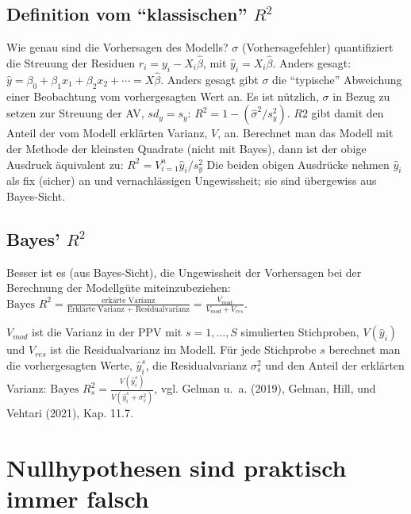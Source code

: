 \documentclass[
  a4paper,
  DIV=11]{scrreprt}
\theoremstyle{definition}
\theoremstyle{remark}
\begin{document}
\hypertarget{definition-vom-klassischen-r2}{%
\subsection{\texorpdfstring{Definition vom ``klassischen''
\(R^2\)}{Definition vom ``klassischen'' R\^{}2}}\label{definition-vom-klassischen-r2}}

Wie genau sind die Vorhersagen des Modells? \(\sigma\)
(Vorhersagefehler) quantifiziert die Streuung der Residuen
\(r_i = y_i - X_i\hat{\beta}\), mit \(\hat{y}_i = X_i\hat{\beta}\).
Anders gesagt:
\(\hat{y} = \beta_0 + \beta_1x_1 + \beta_2x_2 + \cdots = X\hat{\beta}\).
Anders gesagt gibt \(\sigma\) die ``typische'' Abweichung einer
Beobachtung vom vorhergesagten Wert an. Es ist nützlich, \(\sigma\) in
Bezug zu setzen zur Streuung der AV, \(sd_y=s_y\):
\(R^2 = 1- (\hat{\sigma}^2/s^2_y)\). \(R2\) gibt damit den Anteil der
vom Modell erklärten Varianz, \(V\), an. Berechnet man das Modell mit
der Methode der kleinsten Quadrate (nicht mit Bayes), dann ist der obige
Ausdruck äquivalent zu: \(R^2=V_{i=1}^n \hat{y}_i/s_y^2\) Die beiden
obigen Ausdrücke nehmen \(\hat{y}_i\) als fix (sicher) an und
vernachlässigen Ungewissheit; sie sind übergewiss aus Bayes-Sicht.

\hypertarget{bayes-r2}{%
\subsection{\texorpdfstring{Bayes'
\(R^2\)}{Bayes' R\^{}2}}\label{bayes-r2}}

Besser ist es (aus Bayes-Sicht), die Ungewissheit der Vorhersagen bei
der Berechnung der Modellgüte miteinzubeziehen:
\(\text{Bayes }R^2 = \frac{\text{erkärte Varianz}}{\text{Erklärte Varianz + Residualvarianz}}= \frac{V_{mod}}{V_{mod} + V_{res}}\).

\(V_{mod}\) ist die Varianz in der PPV mit \(s = 1, \ldots, S\)
simulierten Stichproben, \(V(\hat{y}_i)\) und \(V_{res}\) ist die
Residualvarianz im Modell. Für jede Stichprobe \(s\) berechnet man die
vorhergesagten Werte, \(\hat{y}_i^s\), die Residualvarianz
\(\sigma^2_s\) und den Anteil der erklärten Varianz:
\(\text{Bayes }R^2_s = \frac{V(\hat{y}_i^s)}{V(\hat{y}_i^s+\sigma_s^2)}\),
vgl. Gelman u.~a. (2019), Gelman, Hill, und Vehtari (2021), Kap. 11.7.

\hypertarget{sec-rope}{%
\section{Nullhypothesen sind praktisch immer falsch}\label{sec-rope}}
\end{document}
